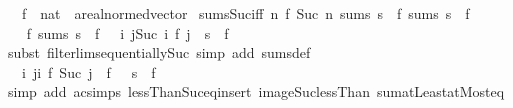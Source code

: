 \begin{isabellebody}
%
\isadelimdocument
%
\endisadelimdocument
{}\isamarkupfalse%
\isanewline
\ \ \ f\ {\isacharcolon}{\kern0pt}{\isacharcolon}{\kern0pt}\ {\isachardoublequoteopen}nat\ {\isasymRightarrow}\ {\isacharprime}{\kern0pt}a{\isacharcolon}{\kern0pt}{\isacharcolon}{\kern0pt}real{\isacharunderscore}{\kern0pt}normed{\isacharunderscore}{\kern0pt}vector{\isachardoublequoteclose}\isanewline
{}\isanewline
\isanewline
{}\isamarkupfalse%
\ sums{\isacharunderscore}{\kern0pt}Suc{\isacharunderscore}{\kern0pt}iff{\isacharcolon}{\kern0pt}\ {\isachardoublequoteopen}{\isacharparenleft}{\kern0pt}{\isasymlambda}n{\isachardot}{\kern0pt}\ f\ {\isacharparenleft}{\kern0pt}Suc\ n{\isacharparenright}{\kern0pt}{\isacharparenright}{\kern0pt}\ sums\ s\ {\isasymlongleftrightarrow}\ f\ sums\ {\isacharparenleft}{\kern0pt}s\ {\isacharplus}{\kern0pt}\ f\ {}{\isacharparenright}{\kern0pt}{\isachardoublequoteclose}\isanewline
%
\isadelimproof
%
\endisadelimproof
%
\isatagproof
{}\isamarkupfalse%
\ {\isacharminus}{\kern0pt}\isanewline
\ \ \isamarkupfalse%
\ {\isachardoublequoteopen}f\ sums\ {\isacharparenleft}{\kern0pt}s\ {\isacharplus}{\kern0pt}\ f\ {}{\isacharparenright}{\kern0pt}\ {\isasymlongleftrightarrow}\ {\isacharparenleft}{\kern0pt}{\isasymlambda}i{\isachardot}{\kern0pt}\ {\isasymSum}j{\isacharless}{\kern0pt}Suc\ i{\isachardot}{\kern0pt}\ f\ j{\isacharparenright}{\kern0pt}\ {\isasymlonglonglongrightarrow}\ s\ {\isacharplus}{\kern0pt}\ f\ {}{\isachardoublequoteclose}\isanewline
\ \ \ \ \isamarkupfalse%
\ {\isacharparenleft}{\kern0pt}subst\ filterlim{\isacharunderscore}{\kern0pt}sequentially{\isacharunderscore}{\kern0pt}Suc{\isacharparenright}{\kern0pt}\ {\isacharparenleft}{\kern0pt}simp\ add{\isacharcolon}{\kern0pt}\ sums{\isacharunderscore}{\kern0pt}def{\isacharparenright}{\kern0pt}\isanewline
\ \ \isamarkupfalse%
\ \isamarkupfalse%
\ {\isachardoublequoteopen}{\isasymdots}\ {\isasymlongleftrightarrow}\ {\isacharparenleft}{\kern0pt}{\isasymlambda}i{\isachardot}{\kern0pt}\ {\isacharparenleft}{\kern0pt}{\isasymSum}j{\isacharless}{\kern0pt}i{\isachardot}{\kern0pt}\ f\ {\isacharparenleft}{\kern0pt}Suc\ j{\isacharparenright}{\kern0pt}{\isacharparenright}{\kern0pt}\ {\isacharplus}{\kern0pt}\ f\ {}{\isacharparenright}{\kern0pt}\ {\isasymlonglonglongrightarrow}\ s\ {\isacharplus}{\kern0pt}\ f\ {}{\isachardoublequoteclose}\isanewline
\ \ \ \ \isamarkupfalse%
\ {\isacharparenleft}{\kern0pt}simp\ add{\isacharcolon}{\kern0pt}\ ac{\isacharunderscore}{\kern0pt}simps\ lessThan{\isacharunderscore}{\kern0pt}Suc{\isacharunderscore}{\kern0pt}eq{\isacharunderscore}{\kern0pt}insert{\isacharunderscore}{\kern0pt}{}\ image{\isacharunderscore}{\kern0pt}Suc{\isacharunderscore}{\kern0pt}lessThan\ sum{\isachardot}{\kern0pt}atLeast{}{\isacharunderscore}{\kern0pt}atMost{\isacharunderscore}{\kern0pt}eq{\isacharparenright}{\kern0pt}\isanewline

\end{isabellebody}

